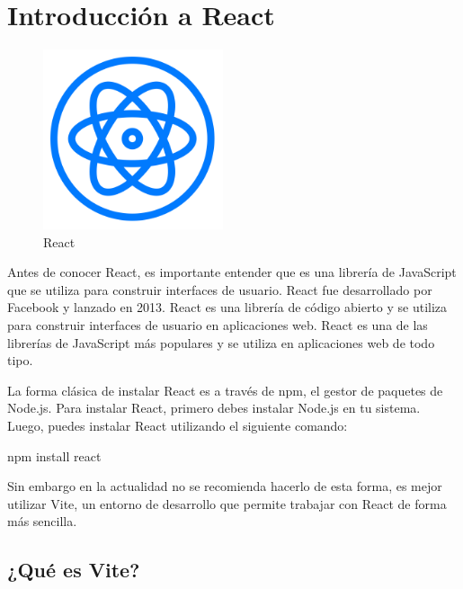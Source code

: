 \documentclass[
  a4paper,
  DIV=11,
  numbers=noendperiod,
  onepage,
  openany]{scrreprt}
\newenvironment{Shaded}{\begin{snugshade}}{\end{snugshade}}
\newcommand{\ExtensionTok}[1]{\textcolor[rgb]{0.00,0.23,0.31}{#1}}
\newcommand{\NormalTok}[1]{\textcolor[rgb]{0.00,0.23,0.31}{#1}}
\begin{document}
\chapter{Introducción a React}\label{introducciuxf3n-a-react}

\begin{figure}[H]

{\centering \includegraphics[width=2.08333in,height=\textheight]{images/react-logo.png}

}

\caption{React}

\end{figure}%

Antes de conocer React, es importante entender que es una librería de
JavaScript que se utiliza para construir interfaces de usuario. React
fue desarrollado por Facebook y lanzado en 2013. React es una librería
de código abierto y se utiliza para construir interfaces de usuario en
aplicaciones web. React es una de las librerías de JavaScript más
populares y se utiliza en aplicaciones web de todo tipo.

La forma clásica de instalar React es a través de npm, el gestor de
paquetes de Node.js. Para instalar React, primero debes instalar Node.js
en tu sistema. Luego, puedes instalar React utilizando el siguiente
comando:

\begin{Shaded}
\begin{Highlighting}[]
\ExtensionTok{npm}\NormalTok{ install react}
\end{Highlighting}
\end{Shaded}

Sin embargo en la actualidad no se recomienda hacerlo de esta forma, es
mejor utilizar Vite, un entorno de desarrollo que permite trabajar con
React de forma más sencilla.

\section{¿Qué es Vite?}\label{quuxe9-es-vite}
\end{document}
